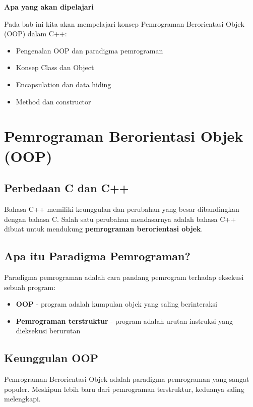 \textbf{Apa yang akan dipelajari}

Pada bab ini kita akan mempelajari konsep Pemrograman Berorientasi Objek (OOP) dalam C++:

\begin{itemize}
\item Pengenalan OOP dan paradigma pemrograman
\item Konsep Class dan Object
\item Encapsulation dan data hiding
\item Method dan constructor
\end{itemize}

\minitoc

\section{Pemrograman Berorientasi Objek (OOP)}\label{pemrograman-berorientasi-obyek}

\subsection{Perbedaan C dan C++}

Bahasa C++ memiliki keunggulan dan perubahan yang besar dibandingkan dengan bahasa C. Salah satu perubahan mendasarnya adalah bahasa C++ dibuat untuk mendukung \textbf{pemrograman berorientasi objek}.

\subsection{Apa itu Paradigma Pemrograman?}

Paradigma pemrograman adalah cara pandang pemrogram terhadap eksekusi sebuah program:
\begin{itemize}
\item \textbf{OOP} - program adalah kumpulan objek yang saling berinteraksi
\item \textbf{Pemrograman terstruktur} - program adalah urutan instruksi yang dieksekusi berurutan
\end{itemize}

\subsection{Keunggulan OOP}

Pemrograman Berorientasi Objek adalah paradigma pemrograman yang sangat populer. Meskipun lebih baru dari pemrograman terstruktur, keduanya saling melengkapi.

